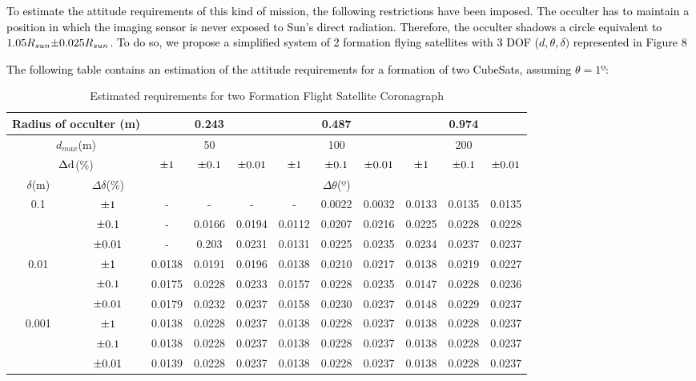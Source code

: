 \newpage

\textcolor{black}{To estimate the attitude requirements of this kind
of mission, the following restrictions have been imposed. The occulter
has to maintain a position in which the imaging sensor is never exposed
to Sun's direct radiation. Therefore, the occulter shadows a circle
equivalent to$1.05R_{sun}\text{\textpm}0.025R_{sun}$. To do so, we
propose a simplified system of 2 formation flying satellites with
3 DOF ($d,\theta,\delta)$ represented in Figure 8}



\textcolor{black}{The following table contains an estimation of the attitude requirements for a formation of two CubeSats, assuming $\theta=1\text{º}$:}

\begin{table}[H]
\centering{}%
\begin{tabular}{|c|c|c|c|c|c|c|c|c|c|c|}
\hline 
\multicolumn{2}{|c|}{Radius of occulter (m)} & \multicolumn{3}{c|}{0.243} & \multicolumn{3}{c|}{0.487} & \multicolumn{3}{c|}{0.974}\tabularnewline
\hline 
\multicolumn{2}{|c|}{$d_{max}$(m)} & \multicolumn{3}{c|}{50} & \multicolumn{3}{c|}{100} & \multicolumn{3}{c|}{200}\tabularnewline
\hline 
\multicolumn{2}{|c|}{$\text{\ensuremath{\Delta}d}$(\%)} & $\text{\textpm}1$ & $\text{\textpm}0.1$ & $\text{\textpm}0.01$ & $\text{\textpm}1$ & $\text{\textpm}0.1$ & $\text{\textpm}0.01$ & $\text{\textpm}1$ & $\text{\textpm}0.1$ & $\text{\textpm}0.01$\tabularnewline
\hline 
\hline 
$\delta$(m) & $\Delta\delta$(\%) & \multicolumn{9}{c|}{$\Delta\theta$(º)}\tabularnewline
\hline 
\multirow{3}{*}{0.1} & $\text{\textpm}1$ & - & - & - & - & 0.0022 & 0.0032 & 0.0133 & 0.0135 & 0.0135\tabularnewline
\cline{2-11} 
 & $\text{\textpm}0.1$ & - & 0.0166 & 0.0194 & 0.0112 & 0.0207 & 0.0216 & 0.0225 & 0.0228 & 0.0228\tabularnewline
\cline{2-11} 
 & $\text{\textpm}0.01$ & - & 0.203 & 0.0231 & 0.0131 & 0.0225 & 0.0235 & 0.0234 & 0.0237 & 0.0237\tabularnewline
\hline 
\multirow{3}{*}{0.01} & $\text{\textpm}1$ & 0.0138 & 0.0191 & 0.0196 & 0.0138 & 0.0210 & 0.0217 & 0.0138 & 0.0219 & 0.0227\tabularnewline
\cline{2-11} 
 & $\text{\textpm}0.1$ & 0.0175 & 0.0228 & 0.0233 & 0.0157 & 0.0228 & 0.0235 & 0.0147 & 0.0228 & 0.0236\tabularnewline
\cline{2-11} 
 & $\text{\textpm}0.01$ & 0.0179 & 0.0232 & 0.0237 & 0.0158 & 0.0230 & 0.0237 & 0.0148 & 0.0229 & 0.0237\tabularnewline
\hline 
\multirow{3}{*}{0.001} & $\text{\textpm}1$ & 0.0138 & 0.0228 & 0.0237 & 0.0138 & 0.0228 & 0.0237 & 0.0138 & 0.0228 & 0.0237\tabularnewline
\cline{2-11} 
 & $\text{\textpm}0.1$ & 0.0138 & 0.0228 & 0.0237 & 0.0138 & 0.0228 & 0.0237 & 0.0138 & 0.0228 & 0.0237\tabularnewline
\cline{2-11} 
 & $\text{\textpm}0.01$ & 0.0139 & 0.0228 & 0.0237 & 0.0138 & 0.0228 & 0.0237 & 0.0138 & 0.0228 & 0.0237\tabularnewline
\hline 
\end{tabular}\caption{Estimated requirements for two Formation Flight Satellite Coronagraph}
\end{table}


